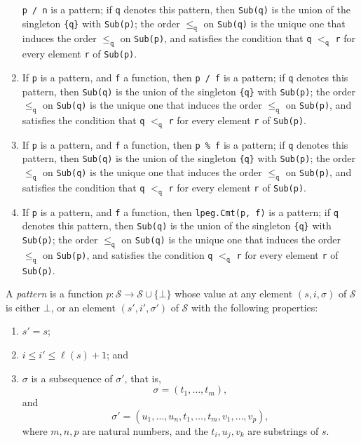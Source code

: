 \documentclass{article}
\begin{document}
\begin{enumerate}
  \verb|p / n| is a pattern; if \verb|q| denotes this pattern, then
  \verb|Sub(q)| is the union of the singleton \verb|{q}| with
  \verb|Sub(p)|; the order \(\leq_\mathtt{q}\) on \verb|Sub(q)| is the
  unique one that induces the order \(\leq_\mathtt{q}\) on
  \verb|Sub(p)|, and satisfies the condition that \verb|q|
  \(<_\mathtt{q}\) \verb|r| for every element \verb|r| of
  \verb|Sub(p)|.
\item If \verb|p| is a pattern, and \verb|f| a function, then
  \verb|p / f| is a pattern; if \verb|q| denotes this pattern, then
  \verb|Sub(q)| is the union of the singleton \verb|{q}| with
  \verb|Sub(p)|; the order \(\leq_\mathtt{q}\) on \verb|Sub(q)| is the
  unique one that induces the order \(\leq_\mathtt{q}\) on
  \verb|Sub(p)|, and satisfies the condition that \verb|q|
  \(<_\mathtt{q}\) \verb|r| for every element \verb|r| of
  \verb|Sub(p)|.
\item If \verb|p| is a pattern, and \verb|f| a function, then
  \verb|p % f| is a pattern; if \verb|q| denotes this pattern, then
  \verb|Sub(q)| is the union of the singleton \verb|{q}| with
  \verb|Sub(p)|; the order \(\leq_\mathtt{q}\) on \verb|Sub(q)| is the
  unique one that induces the order \(\leq_\mathtt{q}\) on
  \verb|Sub(p)|, and satisfies the condition that \verb|q|
  \(<_\mathtt{q}\) \verb|r| for every element \verb|r| of
  \verb|Sub(p)|.
\item If \verb|p| is a pattern, and \verb|f| a function, then
  \verb|lpeg.Cmt(p, f)| is a pattern; if \verb|q| denotes this
  pattern, then \verb|Sub(q)| is the union of the singleton \verb|{q}|
  with \verb|Sub(p)|; the order \(\leq_\mathtt{q}\) on \verb|Sub(q)|
  is the unique one that induces the order \(\leq_\mathtt{q}\) on
  \verb|Sub(p)|, and satisfies the condition \verb|q| \(<_\mathtt{q}\)
  \verb|r| for every element \verb|r| of \verb|Sub(p)|.
\end{enumerate}


A \emph{pattern} is a function
\(p : \mathcal{S} \to \mathcal{S} \cup \{\bot\}\) whose value at any
element \((s, i, \sigma)\) of \(\mathcal{S}\) is either \(\bot\), or
an element \((s', i', \sigma')\) of \(\mathcal{S}\) with the following
properties:
\begin{enumerate}
\item \(s' = s\);
\item \(i \leq i' \leq \ell(s) + 1\); and
\item \(\sigma\) is a subsequence of \(\sigma'\), that is,
  \begin{displaymath}
    \sigma = (t_1, \dotsc, t_m),
  \end{displaymath}
  and
  \begin{displaymath}
    \sigma' =
    (u_1, \dotsc, u_n, t_1, \dotsc, t_m, v_1, \dotsc, v_p),
  \end{displaymath}
  where \(m, n, p\) are natural numbers, and the \(t_i, u_j, v_k\) are
  substrings of \(s\).
\end{enumerate}
\end{document}
